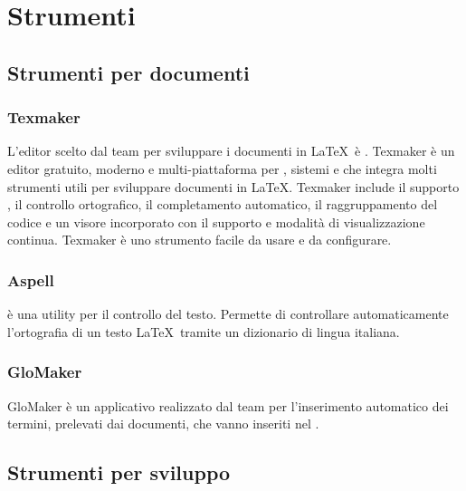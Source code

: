 \documentclass[../NormeDiProgetto.tex]{subfiles}
\begin{document}
\section{Strumenti}
	\subsection{Strumenti per documenti}
    	\subsubsection{Texmaker}
            L'editor scelto dal team per sviluppare i documenti in \LaTeX\ è . Texmaker è un editor gratuito, moderno e multi-piattaforma per , sistemi  e  che integra molti strumenti utili per sviluppare documenti in \LaTeX. Texmaker include il supporto , il controllo ortografico, il completamento automatico, il raggruppamento del codice e un visore incorporato  con il supporto  e modalità di visualizzazione continua. Texmaker è uno strumento facile da usare e da configurare.

            \subsubsection{Aspell}
             è una utility per il controllo del testo. Permette di controllare automaticamente l'ortografia di un testo \LaTeX\ tramite un dizionario di lingua italiana.
            
            \subsubsection{GloMaker}
            GloMaker è un applicativo realizzato dal team per l'inserimento automatico dei termini, prelevati dai documenti, che vanno inseriti nel \glossario.


	\subsection{Strumenti per sviluppo}
\end{document}
